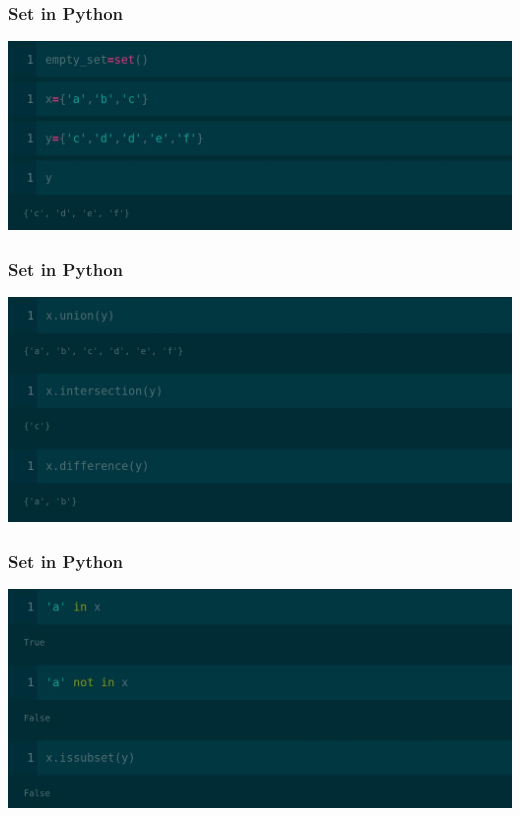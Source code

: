 \documentclass[12pt,aspectratio=169]{beamer}
\begin{document}
\begin{frame}
\frametitle{Set in Python}
\begin{center}
\includegraphics[scale=0.3]{set}
\end{center}
\end{frame}

\begin{frame}
\frametitle{Set in Python}
\begin{center}
\includegraphics[scale=0.3]{union}
\end{center}
\end{frame}


\begin{frame}
\frametitle{Set in Python}
\begin{center}
\includegraphics[scale=0.3]{member}
\end{center}
\end{frame}
\end{document}
